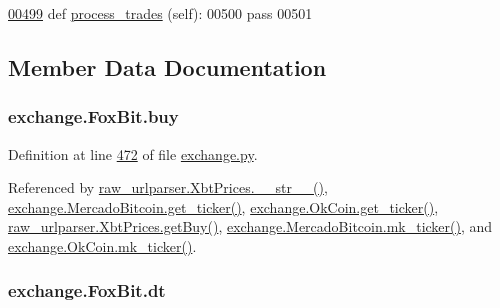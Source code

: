 \begin{DoxyCode}
\hypertarget{classexchange_1_1_fox_bit.tex_l00499}{}\hyperlink{classexchange_1_1_fox_bit_a244f81e91b04a1118d2d17f6c8497cb5}{00499}     \textcolor{keyword}{def }\hyperlink{classexchange_1_1_fox_bit_a244f81e91b04a1118d2d17f6c8497cb5}{process\_trades} (self):
00500         \textcolor{keywordflow}{pass}
00501      
\end{DoxyCode}


\subsection{Member Data Documentation}
\subsubsection[{\texorpdfstring{buy}{buy}}]{\setlength{\rightskip}{0pt plus 5cm}exchange.\+Fox\+Bit.\+buy}\hypertarget{classexchange_1_1_fox_bit_acb7e709cc05e8314b1bdacd32e4dfc80}{}\label{classexchange_1_1_fox_bit_acb7e709cc05e8314b1bdacd32e4dfc80}


Definition at line \hyperlink{exchange_8py_source_l00472}{472} of file \hyperlink{exchange_8py_source}{exchange.\+py}.



Referenced by \hyperlink{raw__urlparser_8py_source_l00074}{raw\+\_\+urlparser.\+Xbt\+Prices.\+\_\+\+\_\+str\+\_\+\+\_\+()}, \hyperlink{exchange_8py_source_l00543}{exchange.\+Mercado\+Bitcoin.\+get\+\_\+ticker()}, \hyperlink{exchange_8py_source_l00608}{exchange.\+Ok\+Coin.\+get\+\_\+ticker()}, \hyperlink{raw__urlparser_8py_source_l00062}{raw\+\_\+urlparser.\+Xbt\+Prices.\+get\+Buy()}, \hyperlink{exchange_8py_source_l00557}{exchange.\+Mercado\+Bitcoin.\+mk\+\_\+ticker()}, and \hyperlink{exchange_8py_source_l00622}{exchange.\+Ok\+Coin.\+mk\+\_\+ticker()}.

\subsubsection[{\texorpdfstring{dt}{dt}}]{\setlength{\rightskip}{0pt plus 5cm}exchange.\+Fox\+Bit.\+dt}\hypertarget{classexchange_1_1_fox_bit_a363f8488eb0423f88519c085ae6f168f}{}\label{classexchange_1_1_fox_bit_a363f8488eb0423f88519c085ae6f168f}


